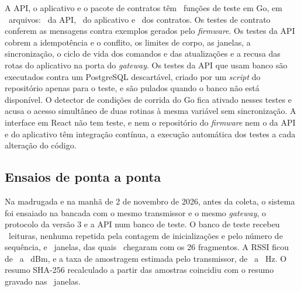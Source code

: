 A API, o aplicativo e o pacote de contratos têm \sisGoFuncoes\ funções de teste em Go, em \sisGoArquivos\ arquivos: \sisGoFuncoesApi\ da API, \sisGoFuncoesMesa\ do aplicativo e \sisGoFuncoesContratos\ dos contratos. Os testes de contrato conferem as mensagens contra exemplos gerados pelo \textit{firmware}. Os testes da API cobrem a idempotência e o conflito, os limites de corpo, as janelas, a sincronização, o ciclo de vida dos comandos e das atualizações e a recusa das rotas do aplicativo na porta do \textit{gateway}. Os testes da API que usam banco são executados contra um PostgreSQL descartável, criado por um \textit{script} do repositório apenas para o teste, e são pulados quando o banco não está disponível. O detector de condições de corrida do Go fica ativado nesses testes e acusa o acesso simultâneo de duas rotinas à mesma variável sem sincronização. A interface em React não tem teste, e nem o repositório do \textit{firmware} nem o da API e do aplicativo têm integração contínua, a execução automática dos testes a cada alteração do código.

\subsection{Ensaios de ponta a ponta}\label{sec:sis-ensaios}

Na madrugada e na manhã de 2 de novembro de 2026, antes da coleta, o sistema foi ensaiado na bancada com o mesmo transmissor e o mesmo \textit{gateway}, o protocolo da versão 3 e a API num banco de teste. O banco de teste recebeu \sisBancoLeituras\ leituras, nenhuma repetida pela contagem de inicializações e pelo número de sequência, e \sisBancoJanelas\ janelas, das quais \sisBancoJanelasCompletas\ chegaram com os \num{26} fragmentos. A RSSI ficou de \sisBancoRssiMin\ a \sisBancoRssiMax~dBm, e a taxa de amostragem estimada pelo transmissor, de \sisBancoTaxaMin\ a \sisBancoTaxaMax~Hz. O resumo SHA-256 recalculado a partir das amostras coincidiu com o resumo gravado nas \sisBancoShaConfere\ janelas.

